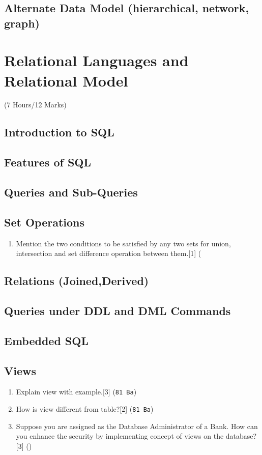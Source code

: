 \documentclass[12pt]{article}
\begin{document}
    \subsection{Alternate Data Model (hierarchical, network, graph)}

    \pagebreak
\section{Relational Languages and Relational Model}
    \begin{center}(7 Hours/12 Marks)\end{center}
    \subsection{Introduction to SQL}
    \subsection{Features of SQL}
    \subsection{Queries and Sub-Queries}
    \subsection{Set Operations}
    \begin{enumerate}
        \item Mention the two conditions to be satisfied by any two sets for union, intersection and set difference operation between them.\hfill[1] (
    \end{enumerate}
    \subsection{Relations (Joined,Derived)}
    \subsection{Queries under DDL and DML Commands}
    \subsection{Embedded SQL}
    \subsection{Views}
    \begin{enumerate}
        \item Explain view with example.\hfill [3] (\texttt{81 Ba})
        \item How is view different from table?\hfill [2] (\texttt{81 Ba})
        \item Suppose you are assigned as the Database Administrator of a Bank. How can you enhance the security by implementing concept of views on the database?\hfill[3] ()
    \end{enumerate}
\end{document}

